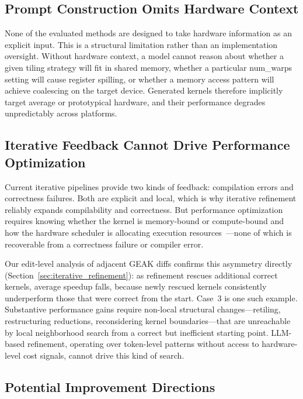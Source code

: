 \subsection{Prompt Construction Omits Hardware Context}

None of the evaluated methods are designed to take hardware information as an explicit input. This is a structural limitation rather than an implementation oversight.
Without hardware context, a model cannot reason about whether a given tiling strategy will fit in shared memory, whether a particular num\_warps setting will cause register spilling, or whether a memory access pattern will achieve coalescing on the target device.
Generated kernels therefore implicitly target average or prototypical hardware, and their performance degrades unpredictably across platforms.

\subsection{Iterative Feedback Cannot Drive Performance Optimization}

Current iterative pipelines provide two kinds of feedback: compilation errors and correctness failures. Both are explicit and local, which is why iterative refinement reliably expands compilability and correctness. But performance optimization requires knowing whether the kernel is memory-bound or compute-bound and how the hardware scheduler is allocating execution resources~\cite{williams2009roofline}---none of which is recoverable from a correctness failure or compiler error.

Our edit-level analysis of adjacent GEAK diffs confirms this asymmetry directly (Section~\ref{sec:iterative_refinement}): as refinement rescues additional correct kernels, average speedup falls, because newly rescued kernels consistently underperform those that were correct from the start. Case~3 is one such example. Substantive performance gains require non-local structural changes---retiling, restructuring reductions, reconsidering kernel boundaries---that are unreachable by local neighborhood search from a correct but inefficient starting point. LLM-based refinement, operating over token-level patterns without access to hardware-level cost signals, cannot drive this kind of search.

\subsection{Potential Improvement Directions}

